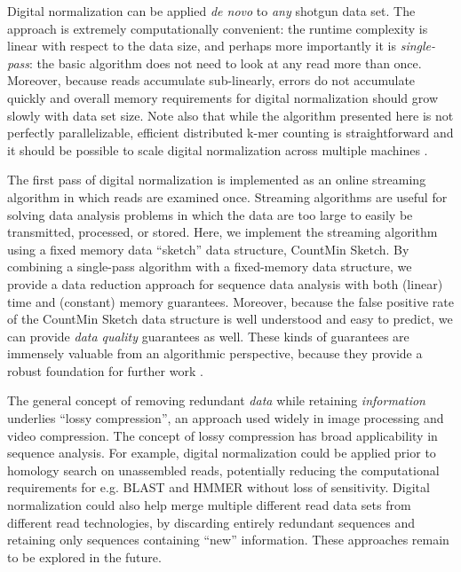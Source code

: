 \documentclass{pnastwo}
\begin{document}
\begin{article}
Digital normalization can be applied {\em de novo} to {\em any}
shotgun data set.  The approach is extremely computationally
convenient: the runtime complexity is linear with respect to the data
size, and perhaps more importantly it is {\em single-pass}: the basic
algorithm does not need to look at any read more than once.  Moreover,
because reads accumulate sub-linearly, errors do not accumulate
quickly and overall memory requirements for digital normalization
should grow slowly with data set size.  Note also that while the
algorithm presented here is not perfectly parallelizable, efficient
distributed k-mer counting is straightforward and it should be
possible to scale digital normalization across multiple machines
\cite{pubmed19357099}.

The first pass of digital normalization is implemented as an online
streaming algorithm in which reads are examined once.  Streaming
algorithms are useful for solving data analysis problems in which
the data are too large to easily be transmitted, processed, or
stored.  Here, we implement the streaming algorithm using a fixed
memory data ``sketch'' data structure, CountMin Sketch.  By combining
a single-pass algorithm with a fixed-memory data structure, we provide
a data reduction approach for sequence data analysis with both
(linear) time and (constant) memory guarantees. Moreover, because the
false positive rate of the CountMin Sketch data structure is well
understood and easy to predict, we can provide {\em data quality}
guarantees as well.  These kinds of guarantees are immensely
valuable from an algorithmic perspective, because they provide a
robust foundation for further work \cite{muthukrishnan2005data}.

The general concept of removing redundant {\em data} while retaining
{\em information} underlies ``lossy compression'', an approach used
widely in image processing and video compression.  The concept of
lossy compression has broad applicability in sequence analysis.
For example, digital normalization could be applied prior to homology
search on unassembled reads, potentially reducing the computational
requirements for e.g. BLAST and HMMER without loss of sensitivity.
Digital normalization could also help merge multiple different read
data sets from different read technologies, by discarding
entirely redundant sequences and retaining only sequences containing
``new'' information.  These approaches remain to be explored in the future.



\end{article}
\end{document}
